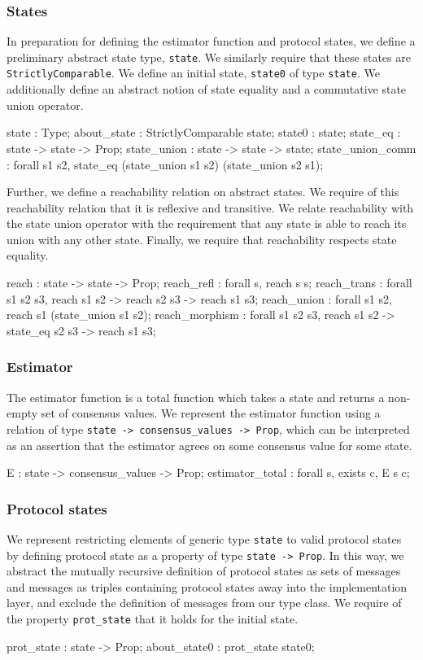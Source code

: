\documentclass[runningheads]{llncs}
\begin{document}
\subsubsection{States} 
In preparation for defining the estimator function and protocol states, we define a preliminary abstract state type, 
\verb|state|. We similarly require that these states are \verb|StrictlyComparable|. We define an initial state, \verb|state0| of type \verb|state|. We additionally define an abstract notion of state equality and a commutative state union operator. 
\begin{coq}
	state : Type;
	about_state : StrictlyComparable state;
	state0 : state;
	state_eq : state -> state -> Prop;
	state_union : state -> state -> state;
	state_union_comm : forall s1 s2, state_eq (state_union s1 s2) 
																						(state_union s2 s1);
\end{coq}
Further, we define a reachability relation on abstract states. We require of this reachability relation that it is reflexive and transitive. We relate reachability with the state union operator with the requirement that any state is able to reach its union with any other state. Finally, we require that reachability respects state equality. 
\begin{coq}
	reach : state -> state -> Prop;
	reach_refl : forall s, reach s s; 
	reach_trans : forall s1 s2 s3, reach s1 s2 -> 
															reach s2 s3 -> 
															reach s1 s3; 
	reach_union : forall s1 s2, reach s1 (state_union s1 s2);  
	reach_morphism : forall s1 s2 s3, reach s1 s2 -> 
																		state_eq s2 s3 -> 
																		reach s1 s3;  
\end{coq}
\subsubsection{Estimator} 
The estimator function is a total function which takes a state and returns a non-empty set of consensus values. We represent the estimator function using a relation of type \verb|state -> consensus_values -> Prop|, which can be interpreted as an assertion that the estimator agrees on some consensus value for some state. 
\begin{coq}
	E : state -> consensus_values -> Prop; 
	estimator_total : forall s, exists c, E s c; 
\end{coq}

\subsubsection{Protocol states}
We represent restricting elements of generic type \verb|state| to valid protocol states by defining protocol state as a property of type \verb|state -> Prop|. In this way, we abstract the mutually recursive definition of protocol states as sets of messages and messages as triples containing protocol states away into the implementation layer, and exclude the definition of messages from our type class. We require of the property \verb|prot_state| that it holds for the initial state. 
\begin{coq}
	prot_state : state -> Prop; 
	about_state0 : prot_state state0; 
\end{coq}
\end{document}
